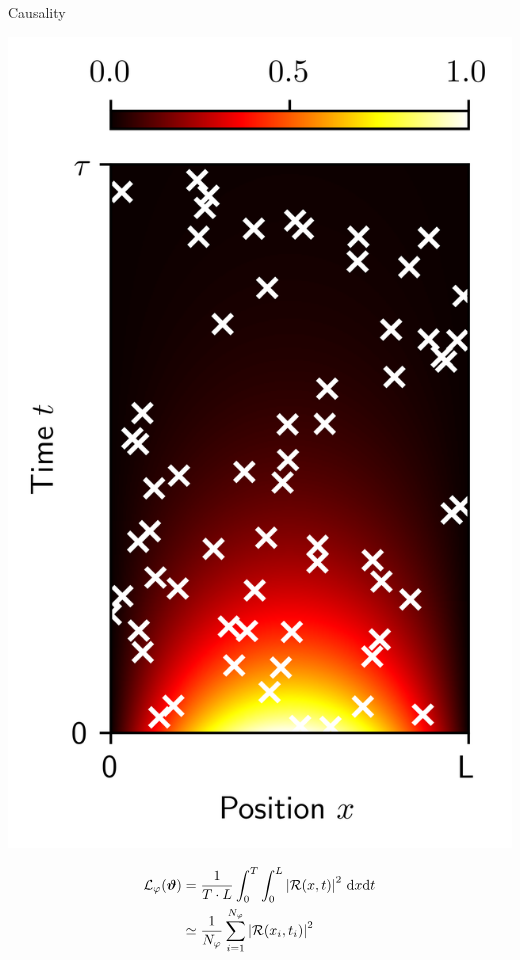 \documentclass[aspectratio=169,compress,12pt,dvipsnames]{beamer}
\begin{document}
\begin{frame}{Causality}
  \vfill
  \begin{minipage}{.28\textwidth}
    \centering
    \includegraphics[width=\textwidth]{spatio_temporal_sampling.png}
  \end{minipage}%
  \hfill
  \begin{minipage}{.68\textwidth}
    \[
      \begin{aligned}
        \mathcal{L}_{\varphi}(\boldsymbol{\vartheta}) & = \dfrac{1}{T \cdot L} \int_{0}^{T} \int_{0}^{L} \abs{\mathcal{R}(x, t)}^2 \ \dd x \dd t  \\
          & \simeq \dfrac{1}{N_{\varphi}} \sum_{i=1}^{N_{\varphi}} \abs{ \mathcal{R}(x_i, t_i) }^2
      \end{aligned}
    \]
  \end{minipage}
  \vfill
\end{frame}
\end{document}
